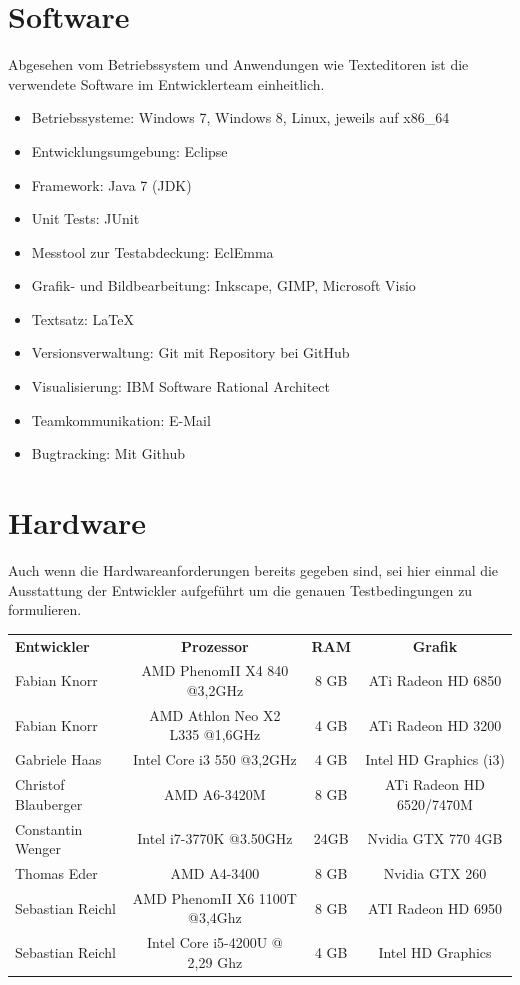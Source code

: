 \documentclass[10pt]{scrreprt}
\begin{document}
\section{Software}
Abgesehen vom Betriebssystem und Anwendungen wie Texteditoren ist die verwendete Software im Entwicklerteam einheitlich.
\begin{itemize}
\item Betriebssysteme: Windows 7, Windows 8, Linux, jeweils auf x86{\_}64
\item Entwicklungsumgebung: Eclipse
\item Framework: Java 7 (JDK)
\item Unit Tests: JUnit
\item Messtool zur Testabdeckung: EclEmma
\item Grafik- und Bildbearbeitung: Inkscape, GIMP, Microsoft Visio
\item Textsatz: \LaTeX
\item Versionsverwaltung: Git mit Repository bei GitHub
\item Visualisierung: IBM Software Rational Architect
\item Teamkommunikation: E-Mail
\item Bugtracking: Mit Github
\end{itemize}


\section{Hardware}
Auch wenn die Hardwareanforderungen bereits gegeben sind, sei hier einmal die Ausstattung der Entwickler aufgeführt um die genauen Testbedingungen zu formulieren.

\vspace{0.5cm}

\begin{tabular}{l|c|c|c}
\textsf{\textbf{Entwickler}} & \textsf{\textbf{Prozessor}} & \textsf{\textbf{RAM}} & \textsf{\textbf{Grafik}} \\
Fabian Knorr & AMD PhenomII X4 840 @3,2GHz & 8 GB & ATi Radeon HD 6850 \\
Fabian Knorr & AMD Athlon Neo X2 L335 @1,6GHz & 4 GB & ATi Radeon HD 3200 \\
Gabriele Haas & Intel Core i3 550 @3,2GHz & 4 GB & Intel HD Graphics (i3) \\
Christof Blauberger & AMD A6-3420M & 8 GB & ATi Radeon HD 6520/7470M \\
Constantin Wenger & Intel i7-3770K @3.50GHz & 24GB & Nvidia GTX 770 4GB \\
Thomas Eder & AMD A4-3400 & 8 GB & Nvidia GTX 260 \\
Sebastian Reichl & AMD PhenomII X6 1100T @3,4Ghz & 8 GB & ATI Radeon HD 6950 \\
Sebastian Reichl & Intel Core i5-4200U @ 2,29 Ghz & 4 GB & Intel HD Graphics \\
\end{tabular}
\end{document}
